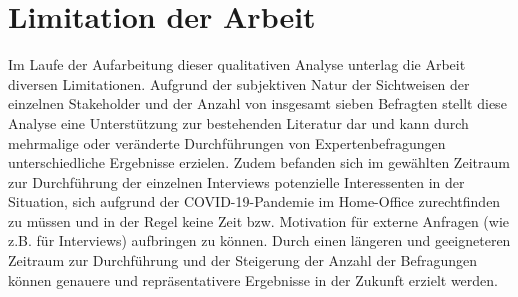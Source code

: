 \section{Limitation der Arbeit}
Im Laufe der Aufarbeitung dieser qualitativen Analyse unterlag die Arbeit diversen Limitationen. Aufgrund der subjektiven Natur der Sichtweisen der einzelnen Stakeholder und der Anzahl von insgesamt sieben Befragten stellt diese Analyse eine Unterstützung zur bestehenden Literatur dar und kann durch mehrmalige oder veränderte Durchführungen von
Expertenbefragungen unterschiedliche Ergebnisse erzielen. Zudem befanden sich im gewählten Zeitraum zur Durchführung der einzelnen Interviews potenzielle Interessenten in der Situation, sich aufgrund der COVID-19-Pandemie im Home-Office zurechtfinden zu müssen und in der Regel keine Zeit bzw. Motivation für externe Anfragen (wie z.B. für Interviews)
aufbringen zu können. Durch einen längeren und geeigneteren Zeitraum zur Durchführung und der Steigerung der Anzahl der Befragungen können genauere und repräsentativere Ergebnisse in der Zukunft erzielt werden. 